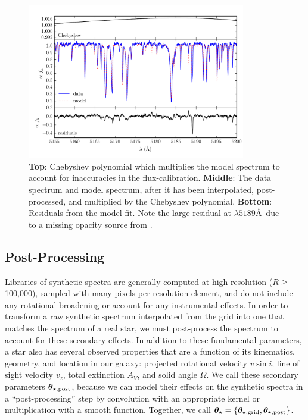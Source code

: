 \documentclass[preprint]{aastex} %
\newcommand{\vt}{ {\bm \theta}}
\newcommand{\vg}{\vt_{\star, {\rm grid}}}
\newcommand{\vpp}{\vt_{\star, {\rm post}}}
\newcommand{\vtstar}{\vt_{\star}}
\begin{document}
\begin{figure}[!htb]
\begin{center}
  \includegraphics[width=0.85\textwidth]{figs/model_data.pdf}
  \caption{\textbf{Top}: Chebyshev polynomial which multiplies the model spectrum
   to account for inaccuracies in the flux-calibration. 
  \textbf{Middle}: The data spectrum and model spectrum, after it has been
   interpolated, post-processed, and multiplied by the Chebyshev polynomial.
  \textbf{Bottom}: Residuals from the model fit. Note the large residual at
   $\lambda5189$\AA\ due to a missing opacity source from .}
\label{fig:model_data}
\end{center}
\end{figure}


\subsection{Post-Processing}
\label{subsec:postprocess}

Libraries of synthetic spectra are generally computed at high resolution ($R
 \geq $100,000), sampled with many pixels per resolution element, and do not
 include any rotational broadening or account for any instrumental effects. 
In order to transform a raw synthetic spectrum interpolated from the grid into
 one that matches the spectrum of a real star, we must post-process the spectrum
 to account for these secondary effects. 
In addition to these fundamental parameters, a star also has several observed
 properties that are a function of its kinematics, geometry, and location in our
 galaxy: projected rotational velocity $v \sin i$, line of sight velocity $v_z$,
 total extinction $A_V$, and solid angle $\Omega$. 
We call these secondary parameters $\vpp$, because we can model their effects
 on the synthetic spectra in a ``post-processing'' step by convolution with an
 appropriate kernel or multiplication with a smooth function. 
Together, we call $\vtstar = \{\vg, \vpp\}$.
\end{document}
